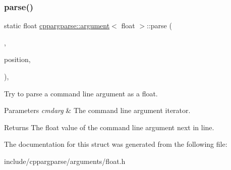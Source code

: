 \subsubsection{\texorpdfstring{parse()}{parse()}}
{\footnotesize\ttfamily static float \hyperlink{structcppargparse_1_1argument}{cppargparse\+::argument}$<$ float $>$\+::parse (\begin{DoxyParamCaption}\item[{const types\+::\+Command\+Line\+\_\+t \&}]{,  }\item[{const types\+::\+Command\+Line\+Position\+\_\+t \&}]{position,  }\item[{const types\+::\+Command\+Line\+Arguments\+\_\+t \&}]{ }\end{DoxyParamCaption})\hspace{0.3cm}{\ttfamily [inline]}, {\ttfamily [static]}}



Try to parse a command line argument as a float. 


\begin{DoxyParams}{Parameters}
{\em cmdarg} & The command line argument iterator.\\
\hline
\end{DoxyParams}
\begin{DoxyReturn}{Returns}
The float value of the command line argument next in line. 
\end{DoxyReturn}


The documentation for this struct was generated from the following file\+:\begin{DoxyCompactItemize}
\item 
include/cppargparse/arguments/float.\+h\end{DoxyCompactItemize}

